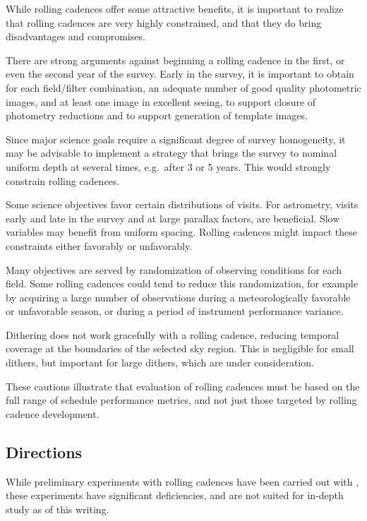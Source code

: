 While rolling cadences offer some attractive benefits, it is important
to realize that rolling cadences are very highly constrained, and that
they do bring disadvantages and compromises.

There are strong arguments against beginning a rolling cadence in the
first, or even the second year of the survey.  Early in the survey, it
is important to obtain for each field/filter combination, an adequate
number of good quality photometric images, and at least one image in
excellent seeing, to support closure of photometry reductions and to
support generation of template images.

Since major science goals require a significant degree of survey
homogeneity, it may be advisable to implement a strategy that brings the
survey to nominal uniform depth at several times, e.g.\ after 3 or 5
years.  This would strongly constrain rolling cadences.

Some science objectives favor certain distributions of visits.  For
astrometry, visits early and late in the survey and at large parallax
factors, are beneficial.  Slow variables may benefit from uniform
spacing.  Rolling cadences might impact these constraints either
favorably or unfavorably.

Many objectives are served by randomization of observing conditions for
each field.  Some rolling cadences could tend to reduce this
randomization, for example by acquiring a large number of observations
during a meteorologically favorable or unfavorable season, or during a
period of instrument performance variance.

Dithering does not work gracefully with a rolling cadence, reducing
temporal coverage at the boundaries of the selected sky region.  This is
negligible for small dithers, but important for large dithers, which are
under consideration.

These cautions illustrate that evaluation of rolling cadences must be
based on the full range of schedule performance metrics, and not just
those targeted by rolling cadence development.



\subsection{Directions}
\label{sec:rolling:directions}

While preliminary experiments with rolling cadences have been carried
out with \OpSim, these experiments have significant deficiencies, and
are not suited for in-depth study as of this writing.

